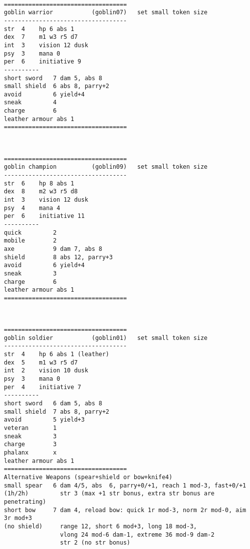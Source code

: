 \

\pagebreak[1]
\tiny \begin{samepage} \begin{verbatim}
===================================
goblin warrior           (goblin07)   set small token size
-----------------------------------
str  4    hp 6 abs 1
dex  7    m1 w3 r5 d7
int  3    vision 12 dusk
psy  3    mana 0
per  6    initiative 9
----------
short sword   7 dam 5, abs 8
small shield  6 abs 8, parry+2
avoid         6 yield+4
sneak         4
charge        6
leather armour abs 1
===================================
\end{verbatim} \end{samepage} \normalsize

\

\pagebreak[1]
\tiny \begin{samepage} \begin{verbatim}
===================================
goblin champion          (goblin09)   set small token size
-----------------------------------
str  6    hp 8 abs 1
dex  8    m2 w3 r5 d8
int  3    vision 12 dusk
psy  4    mana 4
per  6    initiative 11
----------
quick         2
mobile        2
axe           9 dam 7, abs 8
shield        8 abs 12, parry+3
avoid         6 yield+4
sneak         3
charge        6
leather armour abs 1
===================================
\end{verbatim} \end{samepage} \normalsize

\

\pagebreak[1]
\tiny \begin{samepage} \begin{verbatim}
===================================
goblin soldier           (goblin01)   set small token size
-----------------------------------
str  4    hp 6 abs 1 (leather)
dex  5    m1 w3 r5 d7
int  2    vision 10 dusk
psy  3    mana 0
per  4    initiative 7
----------
short sword   6 dam 5, abs 8
small shield  7 abs 8, parry+2
avoid         5 yield+3
veteran       1
sneak         3
charge        3
phalanx       x
leather armour abs 1
===================================
Alternative Weapons (spear+shield or bow+knife4)
small spear   6 dam 4/5, abs  6, parry+0/+1, reach 1 mod-3, fast+0/+1
(1h/2h)         str 3 (max +1 str bonus, extra str bonus are penetrating)
short bow     7 dam 4, reload bow: quick 1r mod-3, norm 2r mod-0, aim 3r mod+3
(no shield)     range 12, short 6 mod+3, long 18 mod-3,
                vlong 24 mod-6 dam-1, extreme 36 mod-9 dam-2
                str 2 (no str bonus)
\end{verbatim} \end{samepage} \normalsize

